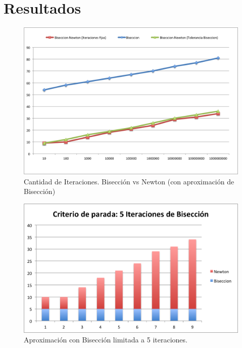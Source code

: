 \documentclass[a4paper]{article}
\begin{document}
\section{Resultados}

\begin{figure}[H]
  \centering
  \includegraphics[scale=0.80]{graficos/1-Biseccion_vs_BiseccionNewton.png}
  \caption{Cantidad de Iteraciones. Bisección vs Newton (con aproximación de Bisección) }
\end{figure}

\begin{figure}[H]
  \centering
  \includegraphics[scale=0.80]{graficos/2-BiseccionXIteraciones.png}
  \caption{Aproximación con Bisección limitada a 5 iteraciones. }
\end{figure}
\end{document}
